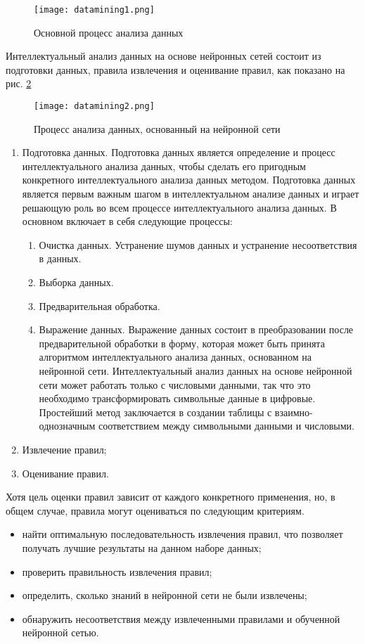 \begin{figure}[h!]
\center
	\texttt{[image: datamining1.png]}
	\caption{Основной процесс анализа данных}
	\label{pict:datamining1}
\end{figure}

Интеллектуальный анализ данных на основе нейронных сетей состоит из
подготовки данных, правила извлечения и оценивание правил, как показано на рис. \ref{pict:datamining2}

\begin{figure}[h!]
\center
	\texttt{[image: datamining2.png]}
	\caption{Процесс анализа данных, основанный на нейронной сети}
	\label{pict:datamining2}
\end{figure}

\begin{enumerate}
\item Подготовка данных.
Подготовка данных является определение и процесс интеллектуального анализа данных, чтобы
сделать его пригодным конкретного интеллектуального анализа данных методом. Подготовка данных является
первым важным шагом в интеллектуальном анализе данных и играет решающую роль
во всем процессе интеллектуального анализа данных. В основном включает в себя
следующие процессы:
\begin{enumerate}
\item Очистка данных. Устранение шумов данных и устранение несоответствия в данных.
\item Выборка данных. 
\item Предварительная обработка. 
\item Выражение данных. Выражение данных состоит в преобразовании после предварительной обработки
в форму, которая может быть принята алгоритмом интеллектуального анализа данных, основанном на нейронной сети. Интеллектуальный анализ данных на основе нейронной сети может работать только с числовыми данными, так что это необходимо трансформировать символьные данные в цифровые. Простейший метод заключается в создании таблицы с взаимно-однозначным соответствием между символьными данными и числовыми. 
\end{enumerate}
\item Извлечение правил;
\item Оценивание правил.
\end{enumerate}
Хотя цель оценки правил зависит от каждого конкретного применения, но, в общем случае, правила могут 
оцениваться по следующим критериям.
\begin{itemize}
\item найти оптимальную последовательность извлечения правил, что позволяет 
получать лучшие результаты на данном наборе данных;
\item проверить правильность извлечения правил;
\item определить, сколько знаний в нейронной сети не были извлечены;
\item обнаружить несоответствия между извлеченными правилами и обученной нейронной сетью.
\end{itemize}

